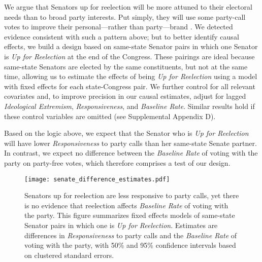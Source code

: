 \documentclass[12pt]{article}
\begin{document}
We argue that Senators up for reelection will be more attuned to their electoral needs than to broad party interests. Put simply, they will use some party-call votes to improve their personal---rather than party---brand
\citep[e.g.,][]{Canes-Wrone:2002, Carson:2010}.  We detected evidence consistent with such a pattern above; but to better identify causal effects, we build a design based on same-state Senator pairs in which one Senator is \textit{Up for Reelection} at the end of the Congress.  These pairings are ideal because same-state Senators are elected by the same constituents, but not at the same time, allowing us to estimate the effects of being \textit{Up for Reelection} using a model with fixed effects for each state-Congress pair.  We further control for all relevant covariates and, to improve precision in our causal estimates, adjust for lagged \textit{Ideological Extremism}, \textit{Responsiveness}, and \textit{Baseline Rate}. Similar results hold if these control variables are omitted (see Supplemental Appendix D).

Based on the logic above, we expect that the Senator who is \textit{Up for Reelection} will have lower \textit{Responsiveness} to party calls than her same-state Senate partner.  In contrast, we expect no difference between the \textit{Baseline Rate} of voting with the party on party-free votes, which therefore comprises a test of our design.

\begin{figure}[t]
\centering
\texttt{[image: senate\_difference\_estimates.pdf]}

\caption{Senators up for reelection are less responsive to party calls, yet there is no evidence that reelection affects \textit{Baseline Rate} of voting with the party.  This figure summarizes fixed effects models of same-state Senator pairs in which one is \textit{Up for Reelection}.  Estimates are differences in \textit{Responsiveness} to party calls and the \textit{Baseline Rate} of voting with the party, with 50\% and 95\% confidence intervals based on clustered standard errors.
\label{fig-reelection-responsiveness}}
\end{figure}
\end{document}
